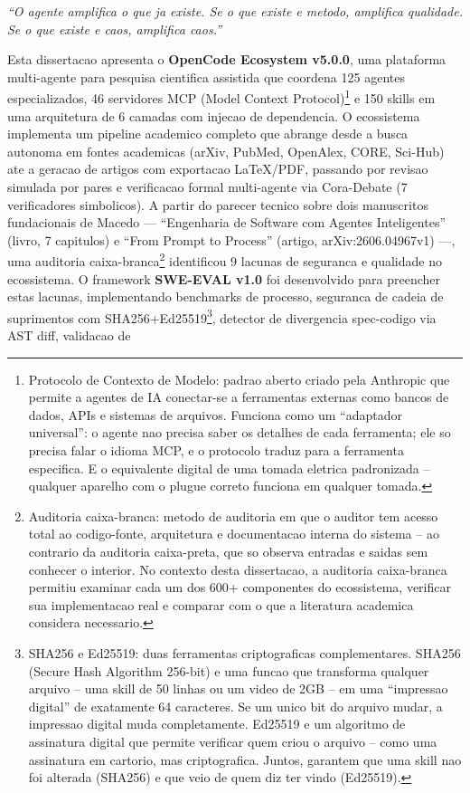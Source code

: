 \documentclass[12pt,a4paper,oneside,sumario=tradicional,chapter=TITLE,section=TITLE,subsection=TITLE,english,brazil]{abntex2}
\begin{document}
\begin{epigrafe}\vspace*{\fill}\begin{flushright}\textit{``O agente amplifica o que ja existe. Se o que existe e metodo, amplifica qualidade. Se o que existe e caos, amplifica caos.''}\\\cite[Cap. 2.7]{macedo2026engenharia}\end{flushright}\end{epigrafe}
\begin{resumoumacoluna}
Esta dissertacao apresenta o \textbf{OpenCode Ecosystem v5.0.0}, uma plataforma multi-agente para pesquisa cientifica assistida que coordena 125 agentes especializados, 46 servidores MCP (Model Context Protocol)\footnote{Protocolo de Contexto de Modelo: padrao aberto criado pela Anthropic que permite a agentes de IA conectar-se a ferramentas externas como bancos de dados, APIs e sistemas de arquivos. Funciona como um ``adaptador universal'': o agente nao precisa saber os detalhes de cada ferramenta; ele so precisa falar o idioma MCP, e o protocolo traduz para a ferramenta especifica. E o equivalente digital de uma tomada eletrica padronizada -- qualquer aparelho com o plugue correto funciona em qualquer tomada.} e 150 skills em uma arquitetura de 6 camadas com injecao de dependencia. O ecossistema implementa um pipeline academico completo que abrange desde a busca autonoma em fontes academicas (arXiv, PubMed, OpenAlex, CORE, Sci-Hub) ate a geracao de artigos com exportacao LaTeX/PDF, passando por revisao simulada por pares e verificacao formal multi-agente via Cora-Debate (7 verificadores simbolicos). A partir do parecer tecnico sobre dois manuscritos fundacionais de Macedo --- ``Engenharia de Software com Agentes Inteligentes'' (livro, 7 capitulos) e ``From Prompt to Process'' (artigo, arXiv:2606.04967v1) ---, uma auditoria caixa-branca\footnote{Auditoria caixa-branca: metodo de auditoria em que o auditor tem acesso total ao codigo-fonte, arquitetura e documentacao interna do sistema -- ao contrario da auditoria caixa-preta, que so observa entradas e saidas sem conhecer o interior. No contexto desta dissertacao, a auditoria caixa-branca permitiu examinar cada um dos 600+ componentes do ecossistema, verificar sua implementacao real e comparar com o que a literatura academica considera necessario.} identificou 9 lacunas de seguranca e qualidade no ecossistema. O framework \textbf{SWE-EVAL v1.0} foi desenvolvido para preencher estas lacunas, implementando benchmarks de processo, seguranca de cadeia de suprimentos com SHA256+Ed25519\footnote{SHA256 e Ed25519: duas ferramentas criptograficas complementares. SHA256 (Secure Hash Algorithm 256-bit) e uma funcao que transforma qualquer arquivo -- uma skill de 50 linhas ou um video de 2GB -- em uma ``impressao digital'' de exatamente 64 caracteres. Se um unico bit do arquivo mudar, a impressao digital muda completamente. Ed25519 e um algoritmo de assinatura digital que permite verificar quem criou o arquivo -- como uma assinatura em cartorio, mas criptografica. Juntos, garantem que uma skill nao foi alterada (SHA256) e que veio de quem diz ter vindo (Ed25519).}, detector de divergencia spec-codigo via AST diff, validacao de 
\end{resumoumacoluna}
\end{document}

